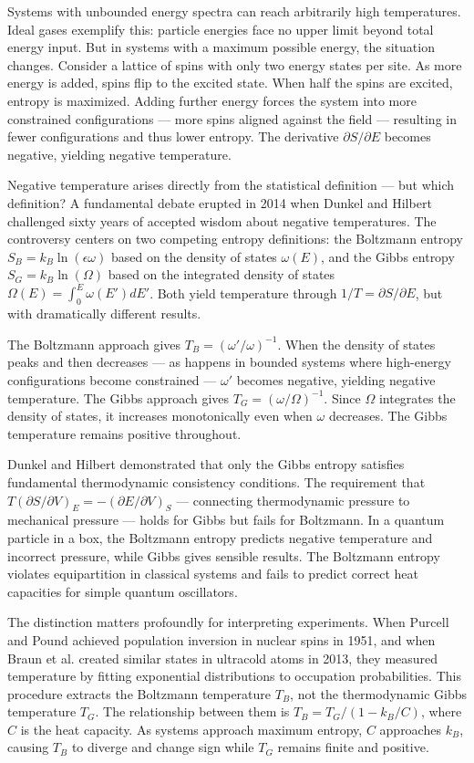 Systems with unbounded energy spectra can reach arbitrarily high temperatures. Ideal gases exemplify this: particle energies face no upper limit beyond total energy input. But in systems with a maximum possible energy, the situation changes. Consider a lattice of spins with only two energy states per site. As more energy is added, spins flip to the excited state. When half the spins are excited, entropy is maximized. Adding further energy forces the system into more constrained configurations — more spins aligned against the field — resulting in fewer configurations and thus lower entropy. The derivative $ \partial S/\partial E $ becomes negative, yielding negative temperature.

Negative temperature arises directly from the statistical definition — but which definition? A fundamental debate erupted in 2014 when Dunkel and Hilbert challenged sixty years of accepted wisdom about negative temperatures. The controversy centers on two competing entropy definitions: the Boltzmann entropy $S_B = k_B \ln(\epsilon \omega)$ based on the density of states $\omega(E)$, and the Gibbs entropy $S_G = k_B \ln(\Omega)$ based on the integrated density of states $\Omega(E) = \int_0^E \omega(E') dE'$. Both yield temperature through $1/T = \partial S/\partial E$, but with dramatically different results.

The Boltzmann approach gives $T_B = (\omega'/\omega)^{-1}$. When the density of states peaks and then decreases — as happens in bounded systems where high-energy configurations become constrained — $\omega'$ becomes negative, yielding negative temperature. The Gibbs approach gives $T_G = (\omega/\Omega)^{-1}$. Since $\Omega$ integrates the density of states, it increases monotonically even when $\omega$ decreases. The Gibbs temperature remains positive throughout.

Dunkel and Hilbert demonstrated that only the Gibbs entropy satisfies fundamental thermodynamic consistency conditions. The requirement that $T(\partial S/\partial V)_E = -(\partial E/\partial V)_S$ — connecting thermodynamic pressure to mechanical pressure — holds for Gibbs but fails for Boltzmann. In a quantum particle in a box, the Boltzmann entropy predicts negative temperature and incorrect pressure, while Gibbs gives sensible results. The Boltzmann entropy violates equipartition in classical systems and fails to predict correct heat capacities for simple quantum oscillators.

The distinction matters profoundly for interpreting experiments. When Purcell and Pound achieved population inversion in nuclear spins in 1951, and when Braun et al. created similar states in ultracold atoms in 2013, they measured temperature by fitting exponential distributions to occupation probabilities. This procedure extracts the Boltzmann temperature $T_B$, not the thermodynamic Gibbs temperature $T_G$. The relationship between them is $T_B = T_G/(1 - k_B/C)$, where $C$ is the heat capacity. As systems approach maximum entropy, $C$ approaches $k_B$, causing $T_B$ to diverge and change sign while $T_G$ remains finite and positive.


